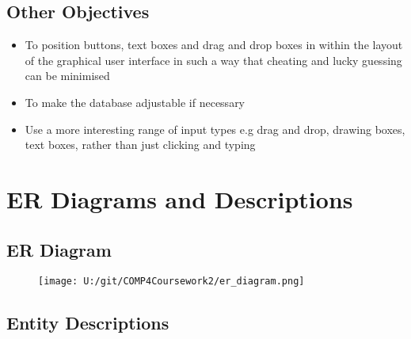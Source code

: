 \subsection{Other Objectives}

\begin{itemize}
	\item To position buttons, text boxes and drag and drop boxes in within the layout of the graphical user interface in such a way that cheating and lucky guessing can be minimised
	\item To make the database adjustable if necessary
	\item Use a more interesting range of input types e.g drag and drop, drawing boxes, text boxes, rather than just clicking and typing
\end{itemize}

\section{ER Diagrams and Descriptions}

\subsection{ER Diagram}

\begin{figure}[H]
    \texttt{[image: U:/git/COMP4Coursework2/er\_diagram.png]}
    \label{fig:print_function_result}
\end{figure}

\subsection{Entity Descriptions}

